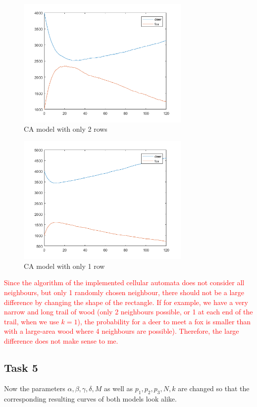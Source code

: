 \documentclass[a4paper,12pt]{article}
\begin{document}
\begin{figure}[h!]
\centering
\includegraphics[width=0.75\textwidth]{CA2R7000C}  
\caption[CAgraph]{CA model with only 2 rows}
\label{CAgraph2rows}
\end{figure} 

\begin{figure}[h!]
\centering
\includegraphics[width=0.75\textwidth]{CA1R14000C}  
\caption[CAgraph]{CA model with only 1 row}
\label{CAgraph1row}
\end{figure} 

\textcolor{red}{
Since the algorithm of the implemented cellular automata does not consider all neighbours, but only 1 randomly chosen neighbour, there should not be a large difference by changing the shape of the rectangle. If for example, we have a very narrow and long trail of wood (only 2 neighbours possible, or 1 at each end of the trail, when we use $k=1$), the probability for a deer to meet a fox is smaller than with a large-area wood where 4 neighbours are possible). Therefore, the large difference does not make sense to me.}

\subsection {Task 5}
Now the parameters $\alpha,\beta,\gamma,\delta,M$ as well as $p_1, p_2, p_3,N, k$ are changed so that the corresponding resulting
curves of both models look alike. 
\end{document}

